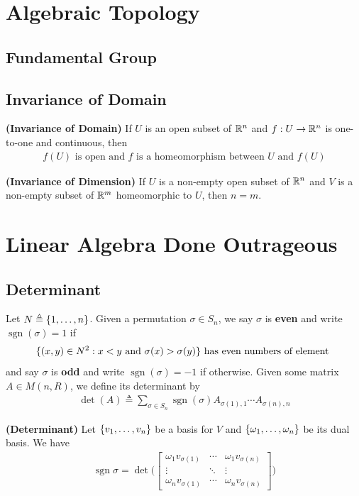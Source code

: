 \documentclass{report}
\begin{document}
\chapter{Algebraic Topology}
\section{Fundamental Group}
\section{Invariance of Domain}
\begin{theorem}
\textbf{(Invariance of Domain)} If $U$ is an open subset of $\mathbb{R}^n$ and  $f:U\rightarrow \mathbb{R}^n$ is one-to-one and continuous, then 
\begin{align*}
f(U)\text{ is open and }f\text{ is a homeomorphism between }U\text{ and }f(U)
\end{align*}
\end{theorem}
\begin{theorem}
\textbf{(Invariance of Dimension)} If $U$ is a non-empty open subset of $\mathbb{R}^n$ and  $V$ is a non-empty subset of $\mathbb{R}^m$ homeomorphic to  $U$, then  $n=m$.
\end{theorem}
\chapter{Linear Algebra Done Outrageous}
\section{Determinant}
\begin{mdframed}
Let $N\triangleq \{ 1,\dots,n \}$. Given a permutation $\sigma \in S_n$, we say $\sigma$ is \textbf{even} and write $\operatorname{sgn}(\sigma)=1$ if  
\begin{align*}
\{ (x,y)\in N^2:x<y\text{ and }\sigma(x)>\sigma (y) \}\text{ has even numbers of element }
\end{align*}
and say $\sigma$ is \textbf{odd} and write $\operatorname{sgn}(\sigma)=-1$ if otherwise. Given some matrix $A\in M(n,R)$, we define its determinant by 
\begin{align*}
\operatorname{det}(A)\triangleq  \sum_{\sigma \in S_n} \operatorname{sgn}(\sigma) A_{\sigma (1),1}\cdots A_{\sigma (n),n} 
\end{align*}
\end{mdframed}
\begin{theorem}
\label{Det}
\textbf{(Determinant)} Let $\{ v_1,\dots ,v_n \}$ be a basis for $V$ and  $\{ \omega_1,\dots ,\omega_n \}$ be its dual basis. We have
\begin{align*}
\operatorname{sgn}\sigma = \operatorname{det}\Big(\begin{bmatrix}
    \omega_1 v_{\sigma (1)} & \cdots & \omega_1 v_{\sigma (n)}\\
    \vdots & \ddots & \vdots \\
    \omega_n v_{\sigma (1)} & \cdots & \omega_n v_{\sigma (n)}  
\end{bmatrix} \Big) 
\end{align*}
\end{theorem}
\end{document}
